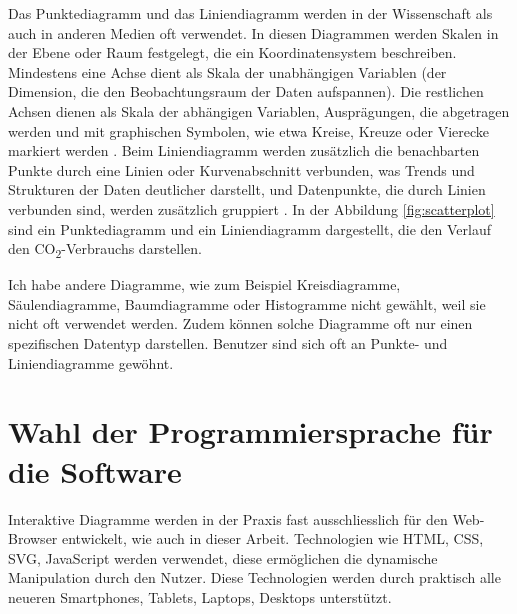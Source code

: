 Das Punktediagramm und das Liniendiagramm werden in der Wissenschaft als auch in anderen Medien oft verwendet. In diesen Diagrammen werden Skalen in der Ebene oder Raum festgelegt, die ein Koordinatensystem beschreiben. Mindestens eine Achse dient als Skala der unabhängigen Variablen (der Dimension, die den Beobachtungsraum der Daten aufspannen). Die restlichen Achsen dienen als Skala der abhängigen Variablen, Ausprägungen, die abgetragen werden und mit graphischen Symbolen, wie etwa Kreise, Kreuze oder Vierecke markiert werden \cite{viz}. Beim Liniendiagramm werden zusätzlich die benachbarten Punkte durch eine Linien oder Kurvenabschnitt verbunden, was Trends und Strukturen der Daten deutlicher darstellt, und Datenpunkte, die durch Linien verbunden sind, werden zusätzlich gruppiert \cite{viz}. In der Abbildung \ref{fig:scatterplot} sind ein Punktediagramm und ein Liniendiagramm dargestellt, die den Verlauf den CO\textsubscript{2}-Verbrauchs darstellen.

Ich habe andere Diagramme, wie zum Beispiel Kreisdiagramme, Säulendiagramme, Baumdiagramme oder Histogramme nicht gewählt, weil sie nicht oft verwendet werden. Zudem können solche Diagramme oft nur einen spezifischen Datentyp darstellen. Benutzer sind sich oft an Punkte- und Liniendiagramme gewöhnt.

\section{Wahl der Programmiersprache für die Software}

Interaktive Diagramme werden in der Praxis fast ausschliesslich für den Web-Browser entwickelt, wie auch in dieser Arbeit. Technologien wie HTML, CSS, SVG, JavaScript werden verwendet, diese ermöglichen die dynamische Manipulation durch den Nutzer. Diese Technologien werden durch praktisch alle neueren Smartphones, Tablets, Laptops, Desktops unterstützt.
